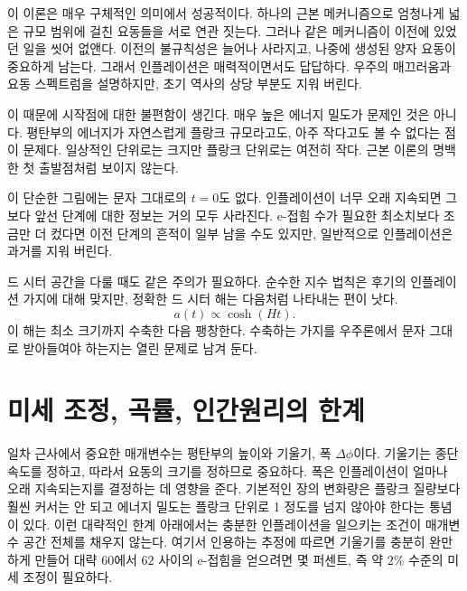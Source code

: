 이 이론은 매우 구체적인 의미에서 성공적이다. 하나의 근본 메커니즘으로 엄청나게 넓은 규모 범위에 걸친 요동들을 서로 연관 짓는다. 그러나 같은 메커니즘이 이전에 있었던 일을 씻어 없앤다. 이전의 불규칙성은 늘어나 사라지고, 나중에 생성된 양자 요동이 중요하게 남는다. 그래서 인플레이션은 매력적이면서도 답답하다. 우주의 매끄러움과 요동 스펙트럼을 설명하지만, 초기 역사의 상당 부분도 지워 버린다.

이 때문에 시작점에 대한 불편함이 생긴다. 매우 높은 에너지 밀도가 문제인 것은 아니다. 평탄부의 에너지가 자연스럽게 플랑크 규모라고도, 아주 작다고도 볼 수 없다는 점이 문제다. 일상적인 단위로는 크지만 플랑크 단위로는 여전히 작다. 근본 이론의 명백한 첫 출발점처럼 보이지 않는다.

이 단순한 그림에는 문자 그대로의 \(t=0\)도 없다. 인플레이션이 너무 오래 지속되면 그보다 앞선 단계에 대한 정보는 거의 모두 사라진다. e-접힘 수가 필요한 최소치보다 조금만 더 컸다면 이전 단계의 흔적이 일부 남을 수도 있지만, 일반적으로 인플레이션은 과거를 지워 버린다.

드 시터 공간을 다룰 때도 같은 주의가 필요하다. 순수한 지수 법칙은 후기의 인플레이션 가지에 대해 맞지만, 정확한 드 시터 해는 다음처럼 나타내는 편이 낫다.
\begin{equation}
a(t)\propto \cosh(Ht).
\end{equation}
이 해는 최소 크기까지 수축한 다음 팽창한다. 수축하는 가지를 우주론에서 문자 그대로 받아들여야 하는지는 열린 문제로 남겨 둔다.

\begin{classroomqa}
\end{classroomqa}

\section{미세 조정, 곡률, 인간원리의 한계}

일차 근사에서 중요한 매개변수는 평탄부의 높이와 기울기, 폭 \(\Delta\phi\)이다. 기울기는 종단 속도를 정하고, 따라서 요동의 크기를 정하므로 중요하다. 폭은 인플레이션이 얼마나 오래 지속되는지를 결정하는 데 영향을 준다. 기본적인 장의 변화량은 플랑크 질량보다 훨씬 커서는 안 되고 에너지 밀도는 플랑크 단위로 1 정도를 넘지 않아야 한다는 통념이 있다. 이런 대략적인 한계 아래에서는 충분한 인플레이션을 일으키는 조건이 매개변수 공간 전체를 채우지 않는다. 여기서 인용하는 추정에 따르면 기울기를 충분히 완만하게 만들어 대략 \(60\)에서 \(62\) 사이의 e-접힘을 얻으려면 몇 퍼센트, 즉 약 \(2\%\) 수준의 미세 조정이 필요하다.

